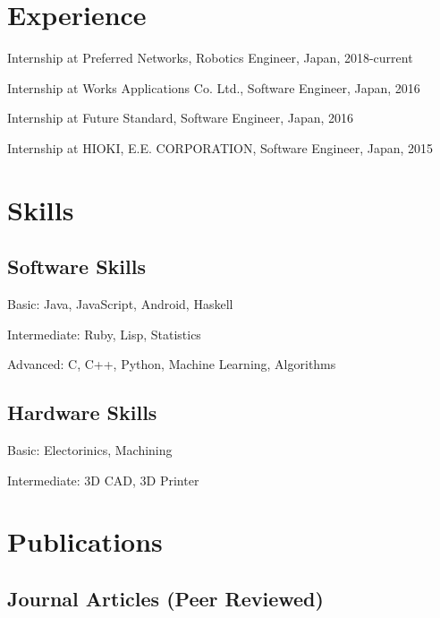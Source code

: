 \documentclass[letterpaper]{article}
\renewenvironment{itemize}{
  \begin{list}{}{
    \setlength{\leftmargin}{1.5em}
  }
}{
  \end{list}
}
\begin{document}
\section*{Experience}

\begin{itemize}
  \item Internship at Preferred Networks, Robotics Engineer, Japan, 2018-current
  \item Internship at Works Applications Co. Ltd., Software Engineer, Japan, 2016
  \item Internship at Future Standard, Software Engineer, Japan, 2016
  \item Internship at HIOKI, E.E. CORPORATION, Software Engineer, Japan, 2015
\end{itemize}

\section*{Skills}

\subsection*{Software Skills}
\begin{itemize}
  \item Basic: Java, JavaScript, Android, Haskell
  \item Intermediate: Ruby, Lisp, Statistics
  \item Advanced: C, C++, Python, Machine Learning, Algorithms
\end{itemize}

\subsection*{Hardware Skills}
\begin{itemize}
  \item Basic: Electorinics, Machining
\item Intermediate: 3D CAD, 3D Printer
\end{itemize}

\section*{Publications}

\subsection*{Journal Articles (Peer Reviewed)}
\end{document}
